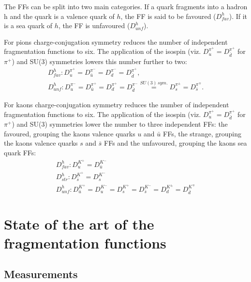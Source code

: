 The FFs can be split into two main categories. If a quark fragments into a hadron h and the quark is a valence quark of $h$, the FF is said to be favoured ($D^h_{fav}$). If it is a sea quark of $h$, the FF is unfavoured ($D^h_{unf}$).

For pions charge-conjugation symmetry reduces the number of independent fragmentation functions to six. The application of the isospin (viz. $D^{\pi^+}_u = D^{\pi^+}_{\bar{d}}$ for $\pi^+$) and SU($3$) symmetries lowers this number further to two:
%
\begin{equation}\label{eq:FFPion}
  \begin{split}
    D^h_{fav}: D^{\pi^+}_u = D^{\pi^-}_{\bar{u}} = D^{\pi^-}_d = D^{\pi^+}_{\bar{d}}, \\
    D^h_{unf}: D^{\pi^-}_u = D^{\pi^+}_{\bar{u}} = D^{\pi^+}_d = D^{\pi^-}_{\bar{d}} \stackrel{SU(3)\,sym.}{=} D^{\pi^{\pm}}_s = D^{\pi^{\mp}}_{\bar{s}}.
  \end{split}
\end{equation}

For kaons charge-conjugation symmetry reduces the number of independent fragmentation functions to six. The application of the isospin (viz. $D^{\pi^+}_u = D^{\pi^+}_{\bar{d}}$ for $\pi^+$) and SU($3$) symmetries lower the number to three independent FFs: the favoured, grouping the kaons valence quarks $u$ and $\bar{u}$ FFs, the strange, grouping the kaons valence quarks $s$ and $\bar{s}$ FFs and the unfavoured, grouping the kaons sea quark FFs:
%
\begin{equation}\label{eq:FFKaon}
  \begin{split}
    D^h_{fav}: D^{K^+}_u = D^{K^-}_{\bar{u}} \\
    D^h_{str}: D^{K^+}_{\bar{s}} = D^{K^-}_{s} \\
    D^h_{unf}: D^{K^+}_{\bar{u}} = D^{K^-}_{u} = D^{K^+}_s = D^{K^-}_{\bar{s}} = D^{K^{\pm}}_{d} = D^{K^{\mp}}_{\bar{d}}
  \end{split}
\end{equation}


\section{State of the art of the fragmentation functions}

\subsection{Measurements}

